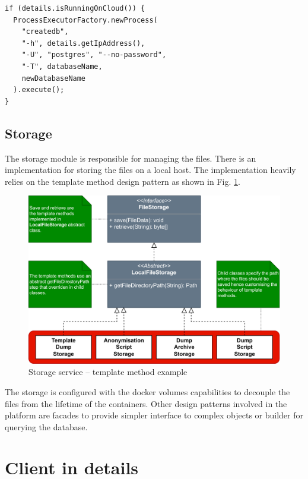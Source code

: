 \documentclass[a4paper,twoside,12pt]{book}
\begin{document}
\begin{verbatim}
if (details.isRunningOnCloud()) {
  ProcessExecutorFactory.newProcess(
    "createdb",
    "-h", details.getIpAddress(),
    "-U", "postgres", "--no-password",
    "-T", databaseName,
    newDatabaseName
  ).execute();
}
\end{verbatim}

\subsection{Storage}

The storage module is responsible for managing the files.
%
There is an implementation for storing the files on a local host. The implementation heavily relies on the template method design pattern \cite{bib:gamma} as shown in Fig. \ref{fig:storage_service}.
%
\begin{figure}
  \centering
  \includegraphics[width=\linewidth]{img/storage_service.png}
  \caption{Storage service -- template method example}
  \label{fig:storage_service}
\end{figure}
%
The storage is configured with the docker volumes capabilities to decouple the files from the lifetime of the containers.
%
Other design patterns involved in the platform are facades to provide simpler interface to complex objects \cite{bib:gamma} or builder for querying the database.

\section{Client in details}
\end{document}

